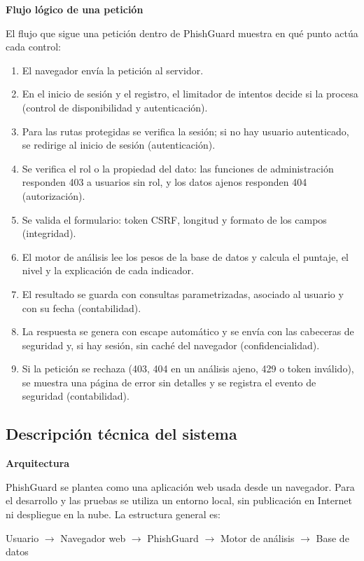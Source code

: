 \documentclass[journal,onecolumn,12pt,draftclsnofoot]{IEEEtran}
\newcommand{\apartado}[1]{\par\medskip\noindent\textbf{#1}\par\smallskip}
\begin{document}
\endgroup

\apartado{Flujo lógico de una petición}

El flujo que sigue una petición dentro de PhishGuard muestra en qué punto actúa cada control:

\begin{enumerate}
  \item El navegador envía la petición al servidor.
  \item En el inicio de sesión y el registro, el limitador de intentos decide si la procesa (control de disponibilidad y autenticación).
  \item Para las rutas protegidas se verifica la sesión; si no hay usuario autenticado, se redirige al inicio de sesión (autenticación).
  \item Se verifica el rol o la propiedad del dato: las funciones de administración responden 403 a usuarios sin rol, y los datos ajenos responden 404 (autorización).
  \item Se valida el formulario: token CSRF, longitud y formato de los campos (integridad).
  \item El motor de análisis lee los pesos de la base de datos y calcula el puntaje, el nivel y la explicación de cada indicador.
  \item El resultado se guarda con consultas parametrizadas, asociado al usuario y con su fecha (contabilidad).
  \item La respuesta se genera con escape automático y se envía con las cabeceras de seguridad y, si hay sesión, sin caché del navegador (confidencialidad).
  \item Si la petición se rechaza (403, 404 en un análisis ajeno, 429 o token inválido), se muestra una página de error sin detalles y se registra el evento de seguridad (contabilidad).
\end{enumerate}

\subsection{Descripción técnica del sistema}\label{sec:tecnica}

\apartado{Arquitectura}

PhishGuard se plantea como una aplicación web usada desde un navegador. Para el desarrollo y las pruebas se utiliza un entorno local, sin publicación en Internet ni despliegue en la nube. La estructura general es:

\begin{center}
Usuario $\rightarrow$ Navegador web $\rightarrow$ PhishGuard $\rightarrow$ Motor de análisis $\rightarrow$ Base de datos
\end{center}
\end{document}
